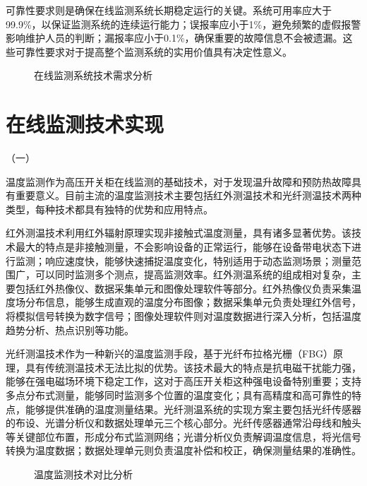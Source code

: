 可靠性要求则是确保在线监测系统长期稳定运行的关键。系统可用率应大于99.9\%，以保证监测系统的连续运行能力；误报率应小于1\%，避免频繁的虚假报警影响维护人员的判断；漏报率应小于0.1\%，确保重要的故障信息不会被遗漏。这些可靠性要求对于提高整个监测系统的实用价值具有决定性意义。

\begin{figure}[h]
\centering
\caption{在线监测系统技术需求分析}
\label{fig:monitoring_requirements}
\end{figure}

\section{在线监测技术实现}

（一）

温度监测作为高压开关柜在线监测的基础技术，对于发现温升故障和预防热故障具有重要意义。目前主流的温度监测技术主要包括红外测温技术和光纤测温技术两种类型，每种技术都具有独特的优势和应用特点。

红外测温技术利用红外辐射原理实现非接触式温度测量，具有诸多显著优势。该技术最大的特点是非接触测量，不会影响设备的正常运行，能够在设备带电状态下进行监测；响应速度快，能够快速捕捉温度变化，特别适用于动态监测场景；测量范围广，可以同时监测多个测点，提高监测效率。红外测温系统的组成相对复杂，主要包括红外热像仪、数据采集单元和图像处理软件等部分。红外热像仪负责采集温度场分布信息，能够生成直观的温度分布图像；数据采集单元负责处理红外信号，将模拟信号转换为数字信号；图像处理软件则对温度数据进行深入分析，包括温度趋势分析、热点识别等功能。

光纤测温技术作为一种新兴的温度监测手段，基于光纤布拉格光栅（FBG）原理，具有传统测温技术无法比拟的优势。该技术最大的特点是抗电磁干扰能力强，能够在强电磁场环境下稳定工作，这对于高压开关柜这种强电设备特别重要；支持多点分布式测量，能够同时监测多个位置的温度变化；具有高精度和高可靠性的特点，能够提供准确的温度测量结果。光纤测温系统的实现方案主要包括光纤传感器的布设、光谱分析仪和数据处理单元三个核心部分。光纤传感器通常沿母线和触头等关键部位布置，形成分布式监测网络；光谱分析仪负责解调温度信息，将光信号转换为温度数据；数据处理单元则负责温度补偿和校正，确保测量结果的准确性。

\begin{figure}[h]
\centering
\caption{温度监测技术对比分析}
\label{fig:temperature_monitoring}
\end{figure}

